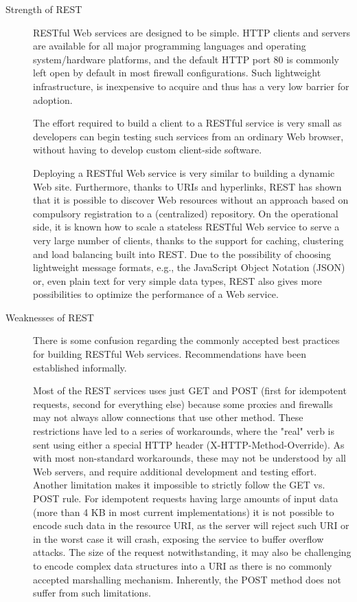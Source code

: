 \documentclass[thesis=B,english]{FITthesis}[2012/10/20]
\begin{document}
	\begin{description}
		\item[Strength of REST] 
RESTful Web services are designed to be simple. HTTP clients and servers are available for all major programming languages and operating system/hardware platforms, and the default HTTP port 80 is commonly left open by default in most firewall configurations. Such lightweight infrastructure, is inexpensive to acquire and thus has a very low barrier for adoption.

The effort required to build a client to a RESTful service is very small as developers can begin testing such services from an ordinary Web browser, without having to develop custom client-side software.\cite{soaprest} 

Deploying a RESTful Web service is very similar to building a dynamic Web site. Furthermore, thanks to URIs and hyperlinks, REST has shown that it is possible to discover Web resources without an approach based on compulsory registration to a (centralized) repository. On the operational side, it is known how to scale a stateless RESTful Web service to serve a very large number of clients, thanks to the support for caching, clustering and load balancing built into REST. Due to the possibility of choosing lightweight message formats, e.g., the JavaScript Object Notation (JSON) or, even plain text for very simple data types, REST also gives more possibilities to optimize the performance of a Web service.
		\item[Weaknesses of REST] 
There is some confusion regarding the commonly accepted best practices for building RESTful Web services. Recommendations have been established informally. 

Most of the REST services uses just GET and POST (first for idempotent requests, second for everything else) because some proxies and firewalls may not always allow connections that use other method.
These restrictions have led to a series of workarounds, where the "real" verb is sent using either a special HTTP header (X-HTTP-Method-Override). As with most non-standard workarounds, these may not be understood by all Web servers, and require additional development and testing effort. Another limitation makes it impossible to strictly follow the GET vs. POST rule. For idempotent requests having large amounts of input data (more than 4 KB in most current implementations) it is not possible to encode such data in the resource URI, as the server will reject such URI or in the worst case it will crash, exposing the service to buffer overflow attacks. The size of the request notwithstanding, it may also be challenging to encode complex data structures into a URI as there is no commonly accepted marshalling mechanism. Inherently, the POST method does not suffer from such limitations.\cite{soaprest}
	\end{description}
\end{document}
